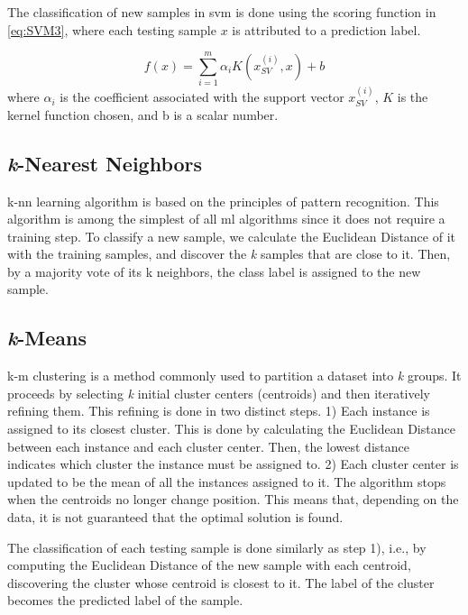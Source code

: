 The classification of new samples in \ac{svm} is done using the scoring function in \ref{eq:SVM3}, where each testing sample $x$ is attributed to a prediction label.

\begin{equation}
\label{eq:SVM3}
f(x)=\sum_{i=1}^m \alpha_i K (x_{SV}^{(i)},x)+b
\end{equation}
where $\alpha_i$ is the coefficient associated with the support vector $x_{SV}^{(i)}$, $K$ is the kernel function chosen, and b is a scalar number.


\subsection{\textit{k}-Nearest Neighbors}
\label{ssec:kNearestNeighbors}

\ac{k-nn} learning algorithm is based on the principles of pattern recognition. This algorithm is among the simplest of all \ac{ml} algorithms since it does not require a training step. To classify a new sample, we calculate the Euclidean Distance of it with the training samples, and discover the \textit{k} samples that are close to it. Then, by a majority vote of its {k} neighbors, the class label is assigned to the new sample.


\subsection{\textit{k}-Means}
\label{ssec:kMeans}

\ac{k-m} clustering is a method commonly used to partition a dataset into \textit{k} groups. It proceeds by selecting \textit{k} initial cluster centers (centroids) and then iteratively refining them. This refining is done in two distinct steps. 1) Each instance is assigned to its closest cluster. This is done by calculating the Euclidean Distance between each instance and each cluster center. Then, the lowest distance indicates which cluster the instance must be assigned to. 2) Each cluster center is updated to be the mean of all the instances assigned to it.
The algorithm stops when the centroids no longer change position. This means that, depending on the data, it is not guaranteed that the optimal solution is found.

The classification of each testing sample is done similarly as step 1), i.e., by computing the Euclidean Distance of the new sample with each centroid, discovering the cluster whose centroid is closest to it. The label of the cluster becomes the predicted label of the sample.



